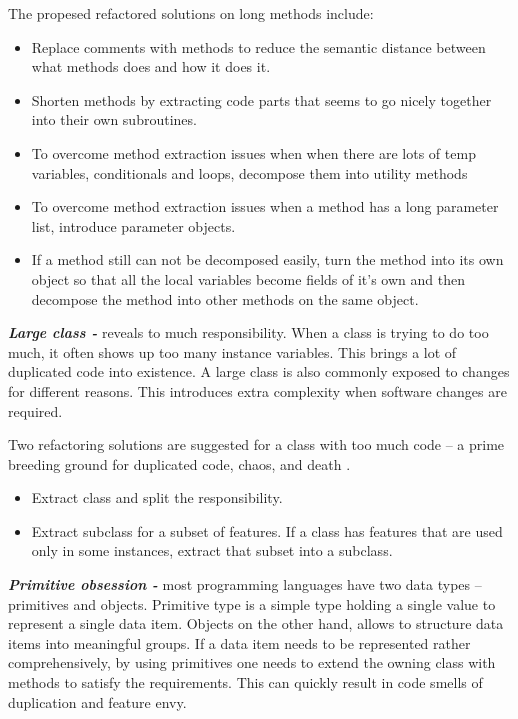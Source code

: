 The propesed refactored solutions \cite{fowlerRefactor} on long methods include:

\begin{itemize}
\item Replace comments with methods to reduce the semantic distance between what methods does and how it does it.
\item Shorten methods by extracting code parts that seems to go nicely together into their own subroutines.
\item To overcome method extraction issues when when there are lots of temp variables, conditionals and loops, decompose them into utility methods 
\item To overcome method extraction issues when a method has a long parameter list, introduce parameter objects.  
\item If a method still can not be decomposed easily, turn the method into its own object so that all the local variables become fields of it's own and then decompose the method into other methods on the same object. 
\end{itemize}

\textit{\textbf{Large class -}} reveals to much responsibility. When a class is trying to do too much, it often shows up too many instance variables. This brings a lot of duplicated code into existence. A large class is also commonly exposed to changes for different reasons. This introduces extra complexity when software changes are required.

Two refactoring solutions are suggested for a class with too much code -- a prime breeding ground for duplicated code, chaos, and death \cite{fowlerRefactor}. 

\begin{itemize}
\item Extract class and split the responsibility. 
\item Extract subclass for a subset of features. If a class has features that are used only in some instances, extract that subset into a subclass.
\end{itemize}

\textit{\textbf{Primitive obsession -}} most programming languages have two data types -- primitives and objects. Primitive type is a simple type holding a single value to represent a single data item. Objects on the other hand, allows to structure data items into meaningful groups. If a data item needs to be represented rather comprehensively, by using primitives one needs to extend the owning class with methods to satisfy the requirements. This can quickly result in code smells of duplication and feature envy.

